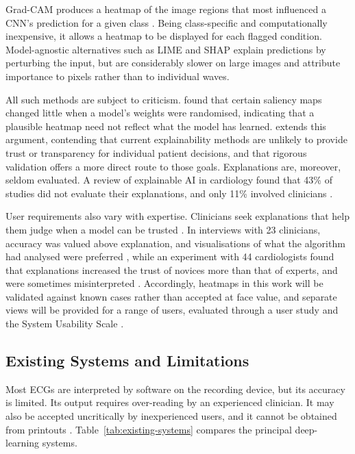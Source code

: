\documentclass[12pt,nonacm,acmlarge,titlepage,screen]{acmart}
\begin{document}
Grad-CAM produces a heatmap of the image regions that most influenced a CNN's prediction for a given class \cite{selvaraju_gradcam_2017}. Being class-specific and computationally inexpensive, it allows a heatmap to be displayed for each flagged condition. Model-agnostic alternatives such as LIME \cite{ribeiro_why_2016} and SHAP \cite{lundberg_unified_2017} explain predictions by perturbing the input, but are considerably slower on large images and attribute importance to pixels rather than to individual waves.

All such methods are subject to criticism. \citet{adebayo_sanity_2018} found that certain saliency maps changed little when a model's weights were randomised, indicating that a plausible heatmap need not reflect what the model has learned. \citet{ghassemi_false_2021} extends this argument, contending that current explainability methods are unlikely to provide trust or transparency for individual patient decisions, and that rigorous validation offers a more direct route to those goals. Explanations are, moreover, seldom evaluated. A review of explainable AI in cardiology found that 43\% of studies did not evaluate their explanations, and only 11\% involved clinicians \cite{salih_review_2024}.

User requirements also vary with expertise. Clinicians seek explanations that help them judge when a model can be trusted \cite{tonekaboni_what_2019}. In interviews with 23 clinicians, accuracy was valued above explanation, and visualisations of what the algorithm had analysed were preferred \cite{hughes-noehrer_contrasting_2024}, while an experiment with 44 cardiologists found that explanations increased the trust of novices more than that of experts, and were sometimes misinterpreted \cite{cabitza_painting_2023}. Accordingly, heatmaps in this work will be validated against known cases rather than accepted at face value, and separate views will be provided for a range of users, evaluated through a user study and the System Usability Scale \cite{brooke_sus_1996,bangor_empirical_2008}.

\subsection{Existing Systems and Limitations}
\label{sec:existing-systems}

Most ECGs are interpreted by software on the recording device, but its accuracy is limited. Its output requires over-reading by an experienced clinician. It may also be accepted uncritically by inexperienced users, and it cannot be obtained from printouts \cite{schlapfer_computer-interpreted_2017}. Table~\ref{tab:existing-systems} compares the principal deep-learning systems.
\end{document}
